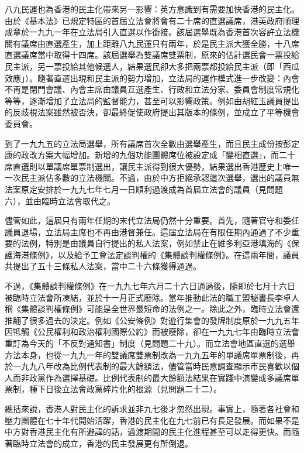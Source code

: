 八九民運也為香港的民主化帶來另一影響：英方意識到有需要加快香港的民主化。由於《基本法》已規定特區的首屆立法會將會有二十席的直選議席，港英政府順理成章於一九九一年在立法局引入直選以作銜接。該屆選舉既為香港首次容許立法機關有議席由直選產生，加上距離八九民運只有兩年，於是民主派大獲全勝，十八席直選議席當中取得十四席。該屆選舉為雙議席雙票制，原來的估計選民會一票投給民主派，另一票投給其他候選人，結果選民卻大多把兩票都投給民主派（即「西瓜效應」）。隨著直選出現和民主派的勢力增加，立法局的運作模式進一步改變：內會不再是閉門會議、內會主席由議員互選產生、行政和立法分家、委員會制度常規化等等，逐漸增加了立法局的監督能力，甚至可以影響政策。例如由胡紅玉議員提出的反歧視法案雖然被否決，卻最終促使政府提出其版本的條例，並成立了平等機會委員會。

到了一九九五的立法局選舉，所有議席首次全數由選舉產生，而且民主成份按彭定康的政改方案大幅增加。新增的九個功能團體席位被設定成「變相直選」，而二十席直選則以單議席單票制選出，讓民主派得到很大優勢，結果選出香港歷史上唯一一次民主派佔多數的立法機關。不過，由於中方拒絕承認這次選舉，選出的議員無法案原定安排於一九九七年七月一日順利過渡成為首屆立法會的議員（見問題六），並由臨時立法會取代之。

儘管如此，這屆只有兩年任期的末代立法局仍然十分重要。首先，隨著官守和委任議員退場，立法局主席也不再由港督兼任。這屆立法局在有限任期內通過了不少重要的法例，特別是由議員自行提出的私人法案，例如禁止在維多利亞港填海的《保護海港條例》，以及給予工會法定談判權的《集體談判權條例》。在這兩年間，議員共提出了五十三條私人法案，當中二十六條獲得通過。

不過，《集體談判權條例》在一九九七年六月二十六日通過後，隨即於七月十六日被臨時立法會所凍結，並於十一月正式廢除。當年推動此法的職工盟秘書長李卓人稱《集體談判權條例》可能是全世界最短命的法例之一。除此之外，臨時立法會還推翻了很多過去的決定。例如《公安條例》對遊行集會的發牌制度原於一九九五年因牴觸《公民權利和政治權利國際公約》而被廢除，卻在一九九七年由臨時立法會重訂為今天的「不反對通知書」制度（見問題二十九）。而立法會地區直選的選舉方法本身，也從一九九一年的雙議席雙票制改為一九九五年的單議席單票制後，再於一九九八年改為比例代表制的最大餘額法，儘管當時民意調查顯示市民喜歡以個人而非政黨作為選擇基礎。比例代表制的最大餘額法結果在實踐中演變成多議席單票制，種下日後立法會政黨碎片化的根源（見問題二十二）。

總括來說，香港人對民主化的訴求並非九七後才忽然出現。事實上，隨著各社會和壓力團體在七十年代開始活躍，香港的民主化在九七前已有長足發展。而如果不是中方對香港民主化有所避諱的話，過渡期間的民主化進程甚至可以走得更快。而隨著臨時立法會的成立，香港的民主發展更有所倒退。

